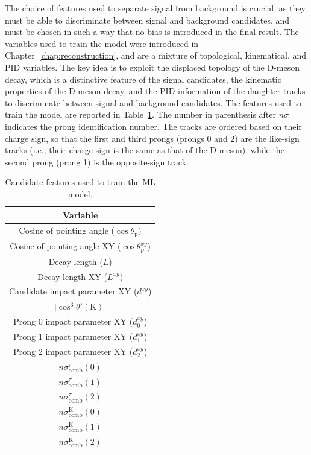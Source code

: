 The choice of features used to separate signal from background is crucial, as they must be able to discriminate between signal and background candidates, and must be chosen in such a way that no bias is introduced in the final result. The variables used to train the model were introduced in Chapter~\ref{chap:reconstruction}, and are a mixture of topological, kinematical, and PID variables. The key idea is to exploit the displaced topology of the D-meson decay, which is a distinctive feature of the signal candidates, the kinematic properties of the D-meson decay, and the PID information of the daughter tracks to discriminate between signal and background candidates. The features used to train the model are reported in Table~\ref{tab:ml_training_vars}. The number in parenthesis after $n\sigma$ indicates the prong identification number. The tracks are ordered based on their charge sign, so that the first and third prongs (prongs 0 and 2) are the like-sign tracks (i.e., their charge sign is the same as that of the D meson), while the second prong (prong 1) is the opposite-sign track.

\begin{table}[tb]
    \begin{center}
    \caption{Candidate features used to train the ML model.}
    \label{tab:ml_training_vars}
    \vspace*{0.3cm}
    \begin{tabular}{c}
         \toprule
         Variable\\
         \midrule         
         Cosine of pointing angle ($\cos\theta_\mathrm{p}$)\\
         Cosine of pointing angle XY ($\cos\theta_\mathrm{p}^{xy}$)\\
         Decay length ($L$)\\
         Decay length XY ($L^{xy}$)\\
         Candidate impact parameter XY ($d^{xy}$)\\
         $\lvert \cos^{3}\theta'(\mathrm K)\rvert$\\
         Prong 0 impact parameter XY ($d_{0}^{xy}$)\\
         Prong 1 impact parameter XY ($d_{1}^{xy}$)\\
         Prong 2 impact parameter XY ($d_{2}^{xy}$)\\
         $n\sigma_\mathrm{comb}^{\pi}(0)$\\         
         $n\sigma_\mathrm{comb}^{\pi}(1)$\\
         $n\sigma_\mathrm{comb}^{\pi}(2)$\\
         $n\sigma_\mathrm{comb}^{\mathrm K}(0)$\\
         $n\sigma_\mathrm{comb}^{\mathrm K}(1)$\\
         $n\sigma_\mathrm{comb}^{\mathrm K}(2)$\\
         \bottomrule
    \end{tabular}
    \end{center}
\end{table}

